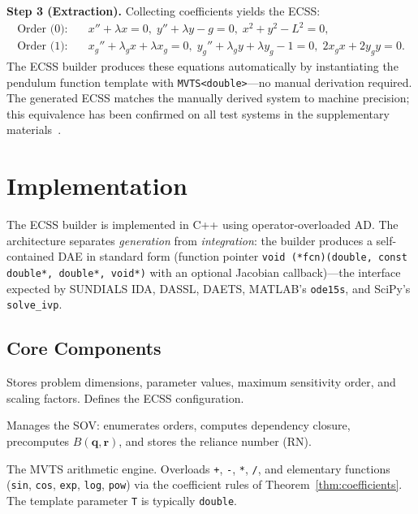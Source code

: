 \documentclass[12pt,a4paper]{article}
\theoremstyle{definition}
\theoremstyle{plain}
\theoremstyle{remark}
\newcommand{\vq}{\mathbf{q}}
\newcommand{\vr}{\mathbf{r}}
\begin{document}
\textbf{Step 3 (Extraction).} Collecting coefficients yields the ECSS:
\begin{align*}
  \text{Order (0):}\quad & x'' + \lambda x = 0,\; y'' + \lambda y - g = 0,\; x^2+y^2-L^2 = 0,\\
  \text{Order (1):}\quad & x_g'' + \lambda_g x + \lambda x_g = 0,\; y_g'' + \lambda_g y + \lambda y_g - 1 = 0,\; 2x_g x + 2y_g y = 0.
\end{align*}
The ECSS builder produces these equations automatically by instantiating the pendulum function template with \texttt{MVTS<double>}---no manual derivation required. The generated ECSS matches the manually derived system to machine precision; this equivalence has been confirmed on all test systems in the supplementary materials~\cite{cao2026supplement}.

\section{Implementation}
\label{sec:implementation}

The ECSS builder is implemented in C++ using operator-overloaded AD. The architecture separates \emph{generation} from \emph{integration}: the builder produces a self-contained DAE in standard form (function pointer \texttt{void (*fcn)(double, const double*, double*, void*)} with an optional Jacobian callback)---the interface expected by SUNDIALS IDA, DASSL, DAETS, MATLAB's \texttt{ode15s}, and SciPy's \texttt{solve\_ivp}.

\subsection{Core Components}

\begin{description}[nosep]
  \item[\texttt{DataPack}] Stores problem dimensions, parameter values, maximum sensitivity order, and scaling factors. Defines the ECSS configuration.
  \item[\texttt{MVTS\_Order}] Manages the SOV: enumerates orders, computes dependency closure, precomputes $B(\vq,\vr)$, and stores the reliance number (RN).
  \item[\texttt{MVTS<T>}] The MVTS arithmetic engine. Overloads \texttt{+}, \texttt{-}, \texttt{*}, \texttt{/}, and elementary functions (\texttt{sin}, \texttt{cos}, \texttt{exp}, \texttt{log}, \texttt{pow}) via the coefficient rules of Theorem~\ref{thm:coefficients}. The template parameter \texttt{T} is typically \texttt{double}.
\end{description}
\end{document}
